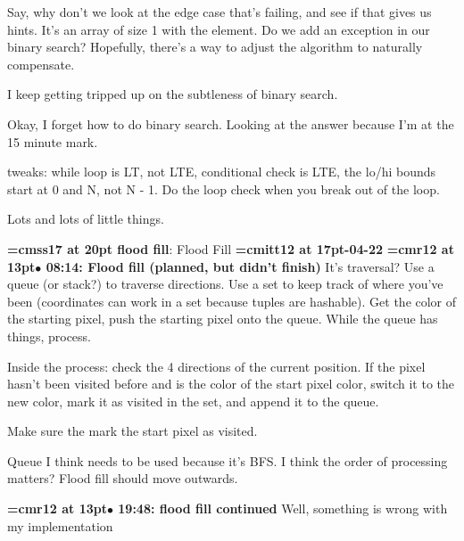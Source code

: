 Say, why don't we look at the edge case that's failing, and see if that gives us hints. It's an array of size 1 with the element. Do we add an exception in our binary search? Hopefully, there's a way to adjust the algorithm to naturally compensate.
\par

I keep getting tripped up on the subtleness of binary search.
\par

Okay, I forget how to do binary search. Looking at the answer because I'm at the 15 minute mark.
\par

tweaks: while loop is LT, not LTE, conditional check is LTE, the lo/hi bounds start at 0 and N, not N - 1. Do the loop check when you break out of the loop.
\par

Lots and lots of little things.
\par

{\medskip\noindent\bf\font\titlefont=cmss17 at 20pt flood fill}: Flood Fill
{\medskip\noindent\bf\font\titlefont=cmitt12 at 17pt-04-22}\medskip
{\smallskip\noindent\bf\font\titlefont=cmr12 at 13pt\titlefont $\bullet$ 08:14: Flood fill (planned, but didn't finish)}\smallskip
It's traversal? Use a queue (or stack?) to traverse directions. Use a set to keep track of where you've been (coordinates can work in a set because tuples are hashable). Get the color of the starting pixel, push the starting pixel onto the queue. While the queue has things, process.
\par

Inside the process: check the 4 directions of the current position. If the pixel hasn't been visited before and is the color of the start pixel color, switch it to the new color, mark it as visited in the set, and append it to the queue.
\par

Make sure the mark the start pixel as visited.
\par

Queue I think needs to be used because it's BFS. I think the order of processing matters? Flood fill should move outwards.
\par

{\smallskip\noindent\bf\font\titlefont=cmr12 at 13pt\titlefont $\bullet$ 19:48: flood fill continued}\smallskip
Well, something is wrong with my implementation
\par


